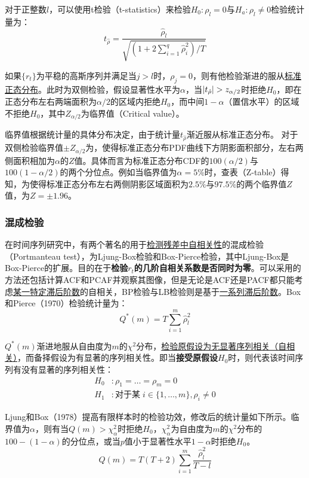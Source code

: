 \documentclass[11pt]{article}
\begin{document}
对于正整数$l$，可以使用t检验（t-statistics）来检验$H_0: \rho_l =0$与$H_a: \rho_l \neq 0$检验统计量为：
\begin{equation*}
    t_{\hat{\rho}} = \frac{\hat{\rho}_l}{\sqrt{\left( 1+2\sum_{i=1}^{q}\hat{\rho}_i^2 \right)/T}}
\end{equation*}

如果$\{r_t\}$为平稳的高斯序列并满足当$j>l$时，$\rho_j=0$，则有他检验渐进的服从\uline{标准正态分布}。此时为双侧检验，假设显著性水平为$\alpha$，当$\left\lvert t_{\hat{\rho}}\right\rvert>z_{\alpha/2}$时拒绝$H_0$，即在正态分布左右两端面积为$\alpha/2$的区域内拒绝$H_0$，而中间$1-\alpha$（置信水平）的区域不拒绝$H_0$，其中$Z_{\alpha/2}$为临界值（Critical value）。

临界值根据统计量的具体分布决定，由于统计量$t_{\hat{\rho}}$渐近服从标准正态分布。
对于双侧检验临界值$\pm Z_{\alpha/2}$为，使得标准正态分布PDF曲线下方阴影面积部分，左右两侧面积相加为$\alpha$的$Z$值。具体而言为标准正态分布CDF的$100(\alpha/2)$与$100(1-\alpha/2)$的两个分位点。例如当临界值为$\alpha=5\%$时，查表（Z-table）得知，为使得标准正态分布左右两侧阴影区域面积为$2.5\%$与$97.5\%$的两个临界值$Z$值，为$Z=\pm 1.96$。

\subsubsection*{混成检验}

在时间序列研究中，有两个著名的用于\uline{检测残差中自相关性}的混成检验（Portmanteau test），为Ljung-Box检验和Box-Pierce检验，其中Ljung-Box是Box-Pierce的扩展。目的在于\textbf{检验$r_t$的几阶自相关系数是否同时为零}。可以采用的方法还包括计算ACF和PCAF并观察其图像，但是无论是ACF还是PACF都只能考虑\uline{某一特定滞后阶数}的自相关，BP检验与LB检验则是基于\uline{一系列滞后阶数}。Box和Pierce（1970）检验统计量为：
\begin{equation*}
    Q^{*}(m) = T\sum_{i=1}^{m} \hat{\rho}_{l}^{2}
\end{equation*}

$Q^{*}(m)$渐进地服从自由度为$m$的$\chi^2$分布，\uline{检验原假设为无显著序列相关（自相关）}，而备择假设为有显著的序列相关性。即当\textbf{接受原假设}$H_0$时，则代表该时间序列有没有显著的序列相关性：
\begin{align*}
    H_0&: \rho_1=\dots=\rho_{m}=0 \\
    H_1&: \text{对于某}\; i \in \{1,\dots,m\},\rho_i \neq 0
\end{align*}

Ljung和Box（1978）提高有限样本时的检验功效，修改后的统计量如下所示。临界值为$\alpha$，则有当$Q(m)>\chi_{\alpha}^{2}$时拒绝$H_0$，$\chi_{\alpha}^{2}$为自由度为$m$的$\chi^{2}$分布的$100-(1-\alpha)$的分位点，或当$p$值小于显著性水平$1-\alpha$时拒绝$H_0$。
\begin{equation*}
    Q(m) = T(T+2) \sum_{i=1}^{m} \frac{\hat{\rho}_{l}^{2}}{T-l}
\end{equation*}
\end{document}
